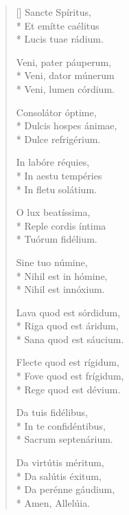 \newHymn
{}

\begin{multicols}{2}
\begin{verse}[\versewidth]
 Sancte Spíritus,\\*
Et emítte caélitus             \\*       
Lucis tuae rádium. 
\pointtrans

Veni, pater páuperum,                 \\*
Veni, dator múnerum                   \\*
Veni, lumen córdium.                  

Consolátor óptime,\\*
Dulcis hospes ánimae,\\*
Dulce refrigérium.                    

In labóre réquies,\\*
In aestu tempéries  \\*                  
In fletu solátium.                    

O lux beatíssima,\\*
Reple cordis íntima\\*                   
Tuórum fidélium.      

Sine tuo númine,\\*
Nihil est in hómine,\\*
Nihil est innóxium.   

Lava quod est sórdidum,\\*
Riga quod est áridum,    \\*             
Sana quod est sáucium.     

Flecte quod est rígidum,\\*
Fove quod est frígidum,   \\*            
Rege quod est dévium.

Da tuis fidélibus,\\*
In te confidéntibus,\\*                  
Sacrum septenárium.   

Da virtútis méritum,\\*
Da salútis éxitum,    \\*                
Da perénne gáudium,     \\*
Amen, Allelúia.           

\end{verse}
\end{multicols}

